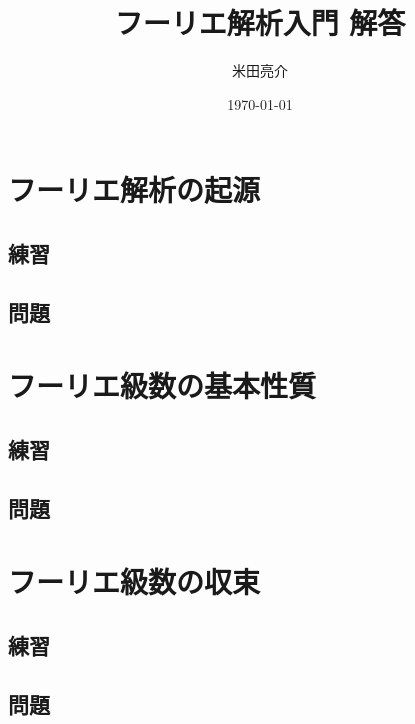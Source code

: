 \documentclass[platex]{jsarticle}
\begin{document}
\title{フーリエ解析入門 解答}
\author{米田亮介}
\date{\today}
\maketitle

\tableofcontents

\newpage
\section{フーリエ解析の起源}
\setcounter{subsection}{2}
\subsection{練習}










\subsection{問題}

\newpage
\section{フーリエ級数の基本性質}
\setcounter{subsection}{5}
\subsection{練習}



\subsection{問題}

\newpage
\section{フーリエ級数の収束}
\setcounter{subsection}{2}
\subsection{練習}
\subsection{問題}
\end{document}
